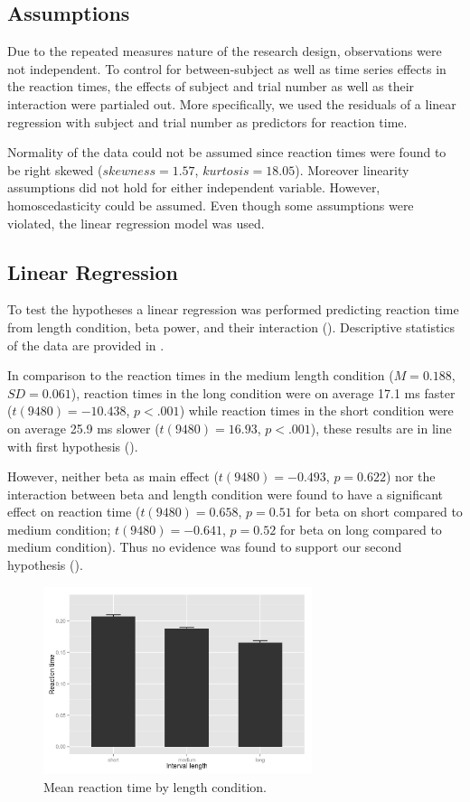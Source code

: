 \documentclass[man,floatsintext]{apa6} %
\begin{document}
\subsection{Assumptions}
Due to the repeated measures nature of the research design,
observations were not independent. To control for between-subject as
well as time series effects in the reaction times, the effects of
subject and trial number as well as their interaction were partialed
out. More specifically, we used the residuals of a linear regression
with subject and trial number as predictors for reaction time.

Normality of the data could not be assumed since reaction times were
found to be right skewed ($skewness = 1.57$, $kurtosis =
18.05$). Moreover linearity assumptions did not hold for either
independent variable. However, homoscedasticity could be assumed. Even
though some assumptions were violated, the linear regression model was
used.

\subsection{Linear Regression}
To test the hypotheses a linear regression was performed predicting
reaction time from length condition, beta power, and their interaction
(). Descriptive statistics of the data are
provided in .

In comparison to the reaction times in the medium length condition ($M
= 0.188$, $SD = 0.061$), reaction times in the long condition were on
average 17.1 ms faster ($t(9480) = -10.438$, $p < .001$) while
reaction times in the short condition were on average 25.9 ms slower
($t(9480) = 16.93$, $p < .001$), these results are in line with first
hypothesis ().

However, neither beta as main effect ($t(9480) = -0.493$, $p = 0.622$)
nor the interaction between beta and length condition were found to
have a significant effect on reaction time ($t(9480) = 0.658$, $p =
0.51$ for beta on short compared to medium condition; $t(9480) =
-0.641$, $p = 0.52$ for beta on long compared to medium
condition). Thus no evidence was found to support our second hypothesis
().

\begin{figure}[!h]
  \includegraphics[width=0.7\textwidth]{actual_rt_by_length}
  \caption{Mean reaction time by length condition.}
  \label{fig:rt_by_length}
\end{figure}
\end{document}
